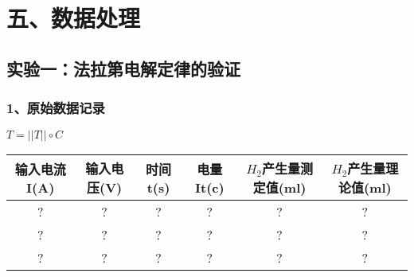 \section*{五、数据处理}
        \subsection*{实验一：法拉第电解定律的验证}
    \subsubsection*{1、原始数据记录}
    \indent $T=||T||\circ C$\\
    \begin{tabular}{|c|c|c|c|c|c|}
        \hline
        输入电流 I(A) & 输入电压(V) & 时间t(s) & 电量It(c) & ${H}_{2}$产生量测定值(ml) & ${H}_{2}$产生量理论值(ml)\\
        \hline
        ? & ? & ? & ? & ? & ?\\
        \hline
        ? & ? & ? & ? & ? & ?\\
        \hline
        ? & ? & ? & ? & ? & ?\\
        \hline
    \end{tabular}

